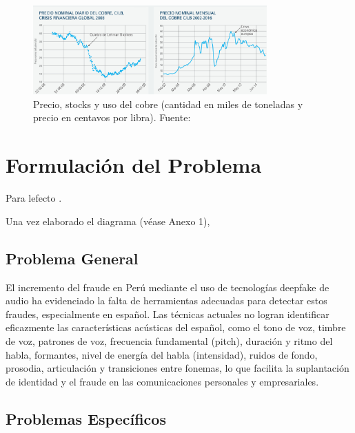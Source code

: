 \begin{figure}[h]
	\begin{center}
		\includegraphics[width=0.8\textwidth]{1/figures/precio_caidas_gustavo_lagos.png}
		\caption{Precio, stocks y uso del cobre (cantidad en miles de toneladas y precio en centavos por libra). Fuente: \cite{cu_lagos2017proyectar}}
		\label{1:fig4}
	\end{center}
\end{figure} 




\section{Formulación del Problema}

Para lefecto \parencite{ot_marti2018manual}. 


Una vez elaborado el diagrama (véase Anexo 1), 

\subsection{Problema General}
\newcommand{\ProblemaGeneral}{
	El incremento del fraude en Perú mediante el uso de tecnologías deepfake de audio ha evidenciado la falta de herramientas adecuadas para detectar estos fraudes, especialmente en español. Las técnicas actuales no logran identificar eficazmente las características acústicas del español, como el tono de voz, timbre de voz, patrones de voz, frecuencia fundamental (pitch), duración y ritmo del habla, formantes, nivel de energía del habla (intensidad), ruidos de fondo, prosodia, articulación y transiciones entre fonemas, lo que facilita la suplantación de identidad y el fraude en las comunicaciones personales y empresariales. 
}
\ProblemaGeneral
\subsection{Problemas Espec\'{i}ficos}
\newcommand{\Pbone}{
La falta de un dataset en español que incluya variaciones regionales y voces manipuladas dificulta el entrenamiento de modelos de redes neuronales profundas para detectar deepfakes de audio en español, debido a las diferencias en patrones de voz, frecuencia fundamental (pitch) y ritmo del habla.
}
\newcommand{\Pbtwo}{
Las técnicas actuales no logran detectar las variaciones en el tono de voz, timbre de voz y formantes en audios en español, lo que disminuye la precisión en la identificación de audios manipulados.
}
\newcommand{\Pbthree}{
Los fraudes por suplantación de identidad mediante deepfakes de audio en Perú son difíciles de detectar con las técnicas actuales debido a la falta de análisis de prosodia, articulación, transiciones entre fonemas y ruidos de fondo, lo que incrementa el riesgo de fraude.
}


